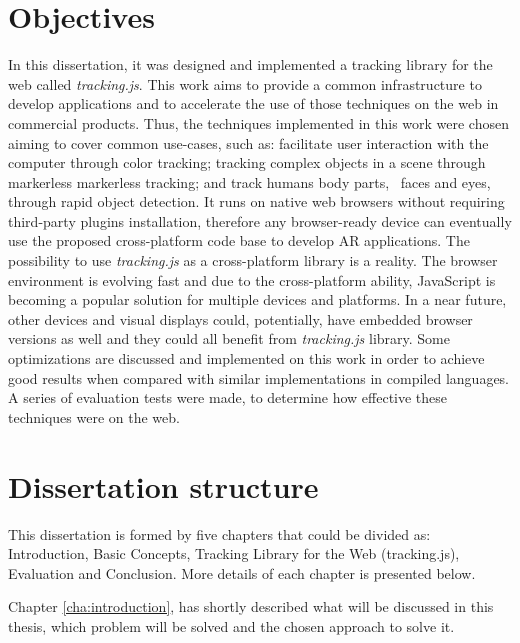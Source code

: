 
\section{Objectives} %
\label{sec:introduction:objectives}

In this dissertation, it was designed and implemented a tracking library for the web called \textit{tracking.js}. This work aims to provide a common infrastructure to develop applications and to accelerate the use of those techniques on the web in commercial products. Thus, the techniques implemented in this work were chosen aiming to cover common use-cases, such as: facilitate user interaction with the computer through color tracking; tracking complex objects in a scene through markerless markerless tracking; and track humans body parts, \eg\ faces and eyes, through rapid object detection. It runs on native web browsers without requiring third-party plugins installation, therefore any browser-ready device can eventually use the proposed cross-platform code base to develop AR applications. The possibility to use \textit{tracking.js} as a cross-platform library is a reality. The browser environment is evolving fast and due to the cross-platform ability, JavaScript \cite{International2009} is becoming a popular solution for multiple devices and platforms. In a near future, other devices and visual displays could, potentially, have embedded browser versions as well and they could all benefit from \textit{tracking.js} library. Some optimizations are discussed and implemented on this work in order to achieve good results when compared with similar implementations in compiled languages. A series of evaluation tests were made, to determine how effective these techniques were on the web.


\section{Dissertation structure} %
\label{sec:introduction:dissertation_structure}

This dissertation is formed by five chapters that could be divided as: Introduction, Basic Concepts, Tracking Library for the Web (tracking.js), Evaluation and Conclusion. More details of each chapter is presented below.

Chapter \ref{cha:introduction}, has shortly described what will be discussed in this thesis, which problem will be solved and the chosen approach to solve it.

